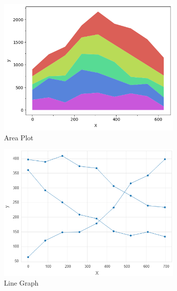 \begin{figure}
    \centering
    \begin{subfigure}[b]{0.32\textwidth}
        \centering
        \includegraphics[width=\textwidth]{figures/body/methodology/MD_area.png}
        \caption{Area Plot}
        \label{figure:area_plot}
    \end{subfigure}
    \hfill
    \begin{subfigure}[b]{0.32\textwidth}
        \centering
        \includegraphics[width=\textwidth]{figures/body/methodology/MD_line.png}
        \caption{Line Graph}
        \label{figure:line_graph}
    \end{subfigure}
    \hfill
    \begin{subfigure}[b]{0.32\textwidth}

\end{subfigure}
\end{figure}
